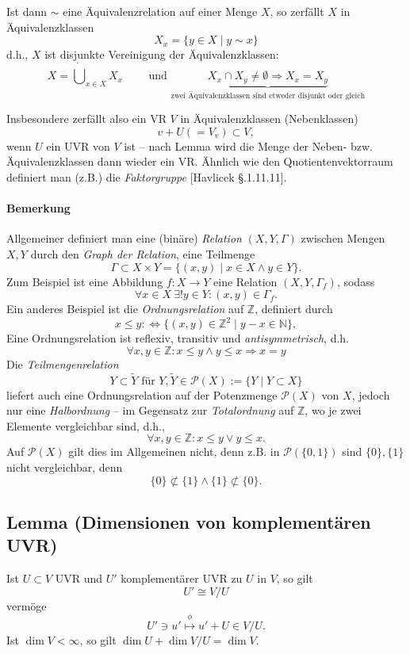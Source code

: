 	Ist dann $ \sim $ eine Äquivalenzrelation auf einer Menge $ X $, so zerfällt $ X $ in Äquivalenzklassen
		\[ X_x = \{y\in X\mid y\sim x\} \]
	d.h., $ X $ ist disjunkte Vereinigung der Äquivalenzklassen:
		\[ X = \dot{\bigcup}_{x\in X}X_x \qquad\text{ und } \underbrace{X_x \cap X_y \neq \emptyset \Rightarrow X_x = X_y}_{\text{zwei Äquivalenzklassen sind etweder disjunkt oder gleich}} \]
		
	Insbesondere zerfällt also ein VR $ V $ in Äquivalenzklassen (Nebenklassen)
		\[ v+U (= V_v)\subset V, \]
	wenn $ U $ ein UVR von $ V $ ist -- nach Lemma wird die Menge der Neben- bzw. Äquivalenzklassen dann wieder ein VR. Ähnlich wie den Quotientenvektorraum definiert man (z.B.) die \emph{Faktorgruppe} [Havlicek §.1.11.11].
	
\paragraph{Bemerkung}
	Allgemeiner definiert man eine (binäre) \emph{Relation} $ (X,Y,\Gamma) $ zwischen Mengen $ X, Y $ durch den \emph{Graph der Relation}, eine Teilmenge
		\[ \Gamma \subset X\times Y = \{(x,y)\mid x\in X \land y\in Y\}. \]
	Zum Beispiel ist eine Abbildung $ f:X\to Y $ eine Relation $ (X,Y,\Gamma_f) $, sodass
		\[ \forall x\in X\ \exists ! y\in Y:(x,y)\in \Gamma_f. \]
	Ein anderes Beispiel ist die \emph{Ordnungsrelation} auf $ \mathbb{Z} $, definiert durch
		\[ x\leq y :\Leftrightarrow \{(x,y)\in \mathbb{Z}^2\mid y-x\in \mathbb{N}\}, \]
	Eine Ordnungsrelation ist reflexiv, transitiv und \emph{antisymmetrisch}, d.h.
	\[\forall x,y\in \mathbb{Z}: x\leq y\land y\leq x\Rightarrow x=y \]
	Die \emph{Teilmengenrelation}
		\[ Y\subset\tilde{Y} \text{ für } Y,\tilde{Y}\in \mathcal{P}(X):= \{Y\mid Y\subset X\} \]
	liefert auch eine Ordnungsrelation auf der Potenzmenge $ \mathcal{P}(X) $ von $ X $, jedoch nur eine \emph{Halbordnung} -- im Gegensatz zur \emph{Totalordnung} auf $ \mathbb{Z} $, wo je zwei Elemente vergleichbar sind, d.h.,
		\[ \forall x,y\in \mathbb{Z}: x\leq y\lor y\leq x. \]
	Auf $ \mathcal{P}(X) $ gilt dies im Allgemeinen nicht, denn z.B. in $ \mathcal{P}(\{0,1\}) $ sind $ \{0\},\{1\} $ nicht vergleichbar, denn
		\[ \{0\}\not\subset\{1\}\land \{1\}\not\subset \{0\}. \]

\subsection{Lemma (Dimensionen von komplementären UVR)}
	\begin{Lemma}
		Ist $ U\subset V $ UVR und $ U' $ komplementärer UVR zu $ U $ in $ V $, so gilt
		\[ U'\cong V/U \]
	vermöge
		\[ U'\ni u' \overset{\phi}{\mapsto} u'+U\in V/U. \]
	Ist $ \dim V<\infty $, so gilt $ \dim U+\dim V/U = \dim V $.
	\end{Lemma}
	
